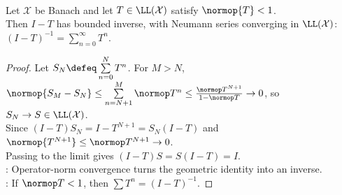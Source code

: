 \begin{corollary} \label{cor:neumann-series-banach-operator} \\
Let $\mathcal{X}$ be Banach and let $T\in\LL(\mathcal{X})$ satisfy $\normop{T}<1$.\\
Then $I-T$ has bounded inverse, with Neumann series converging in $\LL(\mathcal{X})$:
$(I-T)^{-1}=\sum\limits_{n=0}^{\infty}T^n$.
\begin{proof} Let $S_N\defeq\sum\limits_{n=0}^{N}T^n$. For $M>N$, $\normop{S_M-S_N}\leq\sum\limits_{n=N+1}^{M}\normop T^n\leq\frac{\normop T^{N+1}}{1-\normop T}\to0$, so $S_N\to S\in\LL(\mathcal X)$.\\
Since $(I-T)S_N=I-T^{N+1}=S_N(I-T)$ and $\normop{T^{N+1}}\leq\normop T^{N+1}\to0$.\\
Passing to the limit gives $(I-T)S=S(I-T)=I$.\\
: Operator-norm convergence turns the geometric identity into an inverse.\\
: If $\normop T<1$, then $\sum T^n=(I-T)^{-1}$.
\end{proof}
\end{corollary}

